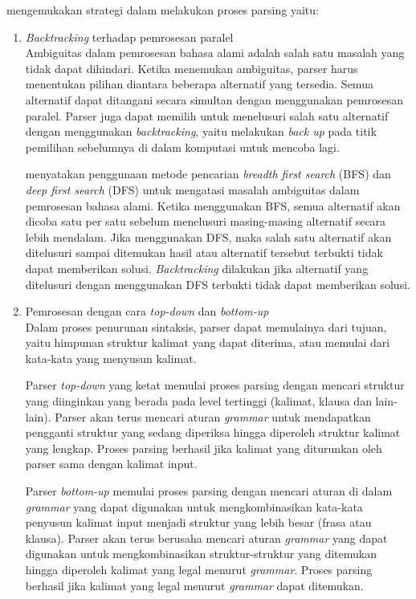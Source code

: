 \citet{bar_feigenbaum} mengemukakan strategi dalam melakukan proses parsing yaitu:
\begin{enumerate}
	\item \emph{Backtracking} terhadap pemrosesan paralel\\
	Ambiguitas dalam pemrosesan bahasa alami adalah salah satu masalah yang tidak dapat dihindari. Ketika menemukan ambiguitas, parser harus menentukan pilihan diantara beberapa alternatif yang tersedia. Semua alternatif dapat ditangani secara simultan dengan menggunakan pemrosesan paralel. Parser juga dapat memilih untuk menelusuri salah satu alternatif dengan menggunakan \emph{backtracking}, yaitu melakukan \emph{back up} pada titik pemilihan sebelumnya di dalam komputasi untuk mencoba lagi.

	\citet{gazdar_mellish} menyatakan penggunaan metode pencarian \emph{breadth first search} (BFS) dan \emph{deep first search} (DFS) untuk mengatasi masalah ambiguitas dalam pemrosesan bahasa alami. Ketika menggunakan BFS, semua alternatif akan dicoba satu per satu sebelum menelusuri masing-masing alternatif secara lebih mendalam. Jika menggunakan DFS, maka salah satu alternatif akan ditelusuri sampai ditemukan hasil atau alternatif tersebut terbukti tidak dapat memberikan solusi. \emph{Backtracking} dilakukan jika alternatif yang ditelusuri dengan menggunakan DFS terbukti tidak dapat memberikan solusi.

	\item Pemrosesan dengan cara \emph{top-down} dan \emph{bottom-up}\\
	Dalam proses penurunan sintaksis, parser dapat memulainya dari tujuan, yaitu himpunan struktur kalimat yang dapat diterima, atau memulai dari kata-kata yang menyusun kalimat.

	Parser \emph{top-down} yang ketat memulai proses parsing dengan mencari struktur yang diinginkan yang berada pada level tertinggi (kalimat, klausa dan lain-lain). Parser akan terus mencari aturan \emph{grammar} untuk mendapatkan pengganti struktur yang sedang diperiksa hingga diperoleh struktur kalimat yang lengkap. Proses parsing berhasil jika kalimat yang diturunkan oleh parser sama dengan kalimat input.

	Parser \emph{bottom-up} memulai proses parsing dengan mencari aturan di dalam \emph{grammar} yang dapat digunakan untuk mengkombinasikan kata-kata penyusun kalimat input menjadi struktur yang lebih besar (frasa atau klausa). Parser akan terus berusaha mencari aturan \emph{grammar} yang dapat digunakan untuk mengkombinasikan struktur-struktur yang ditemukan hingga diperoleh kalimat yang legal menurut \emph{grammar}. Proses parsing berhasil jika kalimat yang legal menurut \emph{grammar} dapat ditemukan.


\end{enumerate}
